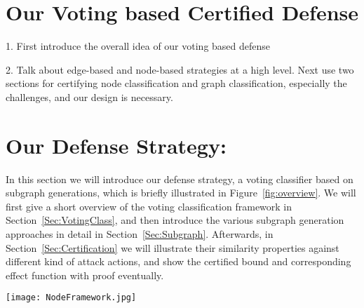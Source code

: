 \section{Our Voting based Certified Defense}
\label{sec:overview}

1. First introduce the overall idea of our voting based defense 

{\color{red} 2. Talk about edge-based and node-based strategies at a high level.  Next use two sections for certifying node classification and graph classification, especially the challenges, and our design is necessary.} 


\section{Our Defense Strategy: {\name}}
In this section we will introduce our defense strategy, a voting classifier based on subgraph generations, which is briefly illustrated in Figure~\ref{fig:overview}. We will first give a short overview of the voting classification framework in Section~\ref{Sec:VotingClass}, and then introduce the various subgraph generation approaches in detail in Section~\ref{Sec:Subgraph}. Afterwards, in Section~\ref{Sec:Certification} we will illustrate their similarity properties against different kind of attack actions, and show the certified bound and corresponding effect function with proof eventually.
\begin{figure*}[t]
    \centering
    \captionsetup[subfloat]{labelsep=none, format=plain, labelformat=empty}

    \texttt{[image: NodeFramework.jpg]}
    \caption{Overview of our proposed certifiably general-robust GNN framework (taking node classification for instance). (a) Given a graph, the voting classifier assembles prediction results on generated subgraphs as votes, and take the majority class as final prediction and gives a deterministic robust bound; (b) Given an arbitrary attack with size features, we evaluate it by a linear effect function with fixed weight; (c) If the evaluated effect is lower than the bound, the attacked prediction is guaranteed to be correct. 
    }
    \label{fig:overview}
\end{figure*}



